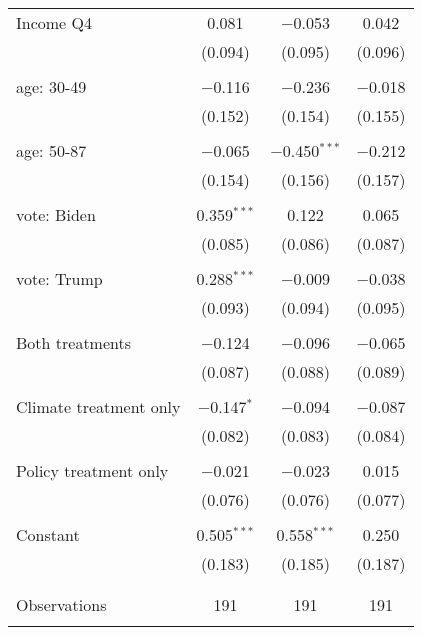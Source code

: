 \begin{tabular}{@{\extracolsep{5pt}}lccc}
 Income Q4 & 0.081 & $-$0.053 & 0.042 \\ 
  & (0.094) & (0.095) & (0.096) \\ 
  & & & \\ 
 age: 30-49 & $-$0.116 & $-$0.236 & $-$0.018 \\ 
  & (0.152) & (0.154) & (0.155) \\ 
  & & & \\ 
 age: 50-87 & $-$0.065 & $-$0.450$^{***}$ & $-$0.212 \\ 
  & (0.154) & (0.156) & (0.157) \\ 
  & & & \\ 
 vote: Biden & 0.359$^{***}$ & 0.122 & 0.065 \\ 
  & (0.085) & (0.086) & (0.087) \\ 
  & & & \\ 
 vote: Trump & 0.288$^{***}$ & $-$0.009 & $-$0.038 \\ 
  & (0.093) & (0.094) & (0.095) \\ 
  & & & \\ 
 Both treatments & $-$0.124 & $-$0.096 & $-$0.065 \\ 
  & (0.087) & (0.088) & (0.089) \\ 
  & & & \\ 
 Climate treatment only & $-$0.147$^{*}$ & $-$0.094 & $-$0.087 \\ 
  & (0.082) & (0.083) & (0.084) \\ 
  & & & \\ 
 Policy treatment only & $-$0.021 & $-$0.023 & 0.015 \\ 
  & (0.076) & (0.076) & (0.077) \\ 
  & & & \\ 
 Constant & 0.505$^{***}$ & 0.558$^{***}$ & 0.250 \\ 
  & (0.183) & (0.185) & (0.187) \\ 
  & & & \\ 
\hline \\[-1.8ex] 

Observations & 191 & 191 & 191 \\ 
\hline 
\hline \\[-1.8ex] 
\end{tabular} 